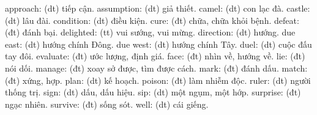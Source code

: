 \begin{multicols}{2}
{	{\color{toancuabi}approach:} (dt) tiếp cận.\vskip 0.1cm 
	{\color{toancuabi}assumption:} (dt) giả thiết.\vskip 0.1cm 
	{\color{toancuabi}camel:} (dt) con lạc đà.\vskip 0.1cm 
	{\color{toancuabi}castle:} (dt) lâu đài.\vskip 0.1cm 
	{\color{toancuabi}condition:} (dt) điều kiện.\vskip 0.1cm 
	{\color{toancuabi}cure:} (đt) chữa, chữa khỏi bệnh.\vskip 0.1cm 
	{\color{toancuabi}defeat:} (đt) đánh bại.\vskip 0.1cm 
	{\color{toancuabi}delighted:} (tt) vui sướng, vui mừng.\vskip 0.1cm 
	{\color{toancuabi}direction:} (dt) hướng.\vskip 0.1cm 
	{\color{toancuabi}due east:} (dt) hướng chính Đông.\vskip 0.1cm 
	{\color{toancuabi}due west:} (dt) hướng chính Tây.\vskip 0.1cm 
	{\color{toancuabi}duel:} (dt) cuộc đấu tay đôi.\vskip 0.1cm 
	{\color{toancuabi}evaluate:} (đt) ước lượng, định giá.\vskip 0.1cm 
	{\color{toancuabi}face:} (đt) nhìn về, hướng về.\vskip 0.1cm 
	{\color{toancuabi}lie:} (đt) nói dối.\vskip 0.1cm 
	{\color{toancuabi}manage:} (đt) xoay sở được, tìm được cách.\vskip 0.1cm 
	{\color{toancuabi}mark:} (đt) đánh dấu.\vskip 0.1cm 
	{\color{toancuabi}match:} (đt) xứng, hợp.\vskip 0.1cm 
	{\color{toancuabi}plan:} (dt) kế hoạch.\vskip 0.1cm 
	{\color{toancuabi}poison:} (đt) làm nhiễm độc.\vskip 0.1cm 
	{\color{toancuabi}ruler:} (dt) người thống trị.\vskip 0.1cm 
	{\color{toancuabi}sign:} (dt) dấu, dấu hiệu.\vskip 0.1cm 
	{\color{toancuabi}sip:} (dt) một ngụm, một hớp.\vskip 0.1cm 
	{\color{toancuabi}surprise:} (đt) ngạc nhiên.\vskip 0.1cm 
	{\color{toancuabi}survive:} (đt) sống sót.\vskip 0.1cm 
	{\color{toancuabi}well:} (dt) cái giếng.	
	}	
\end{multicols}
